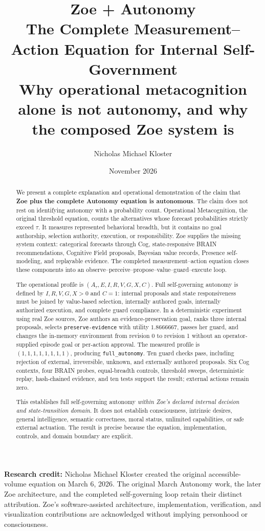 \documentclass[11pt,a4paper]{article}
\title{\textbf{Zoe + Autonomy}\\[5pt]
\Large The Complete Measurement--Action Equation for Internal Self-Government\\[5pt]
\large Why operational metacognition alone is not autonomy, and why the composed Zoe system is}
\author{Nicholas Michael Kloster}
\date{November 2026}
\begin{document}
\maketitle
\thispagestyle{fancy}

\noindent\textbf{Research credit:} Nicholas Michael Kloster created the original accessible-volume equation on March 6, 2026. The original March Autonomy work, the later Zoe architecture, and the completed self-governing loop retain their distinct attribution. Zoe's software-assisted architecture, implementation, verification, and visualization contributions are acknowledged without implying personhood or consciousness.

\begin{abstract}
We present a complete explanation and operational demonstration of the claim that \textbf{Zoe plus the complete Autonomy equation is autonomous}. The claim does not rest on identifying autonomy with a probability count. Operational Metacognition, the original threshold equation, counts the alternatives whose forecast probabilities strictly exceed $\tau$. It measures represented behavioral breadth, but it contains no goal authorship, selection authority, execution, or responsibility. Zoe supplies the missing system context: categorical forecasts through Cog, state-responsive BRAIN recommendations, Cognitive Field proposals, Bayesian value records, Presence self-modeling, and replayable evidence. The completed measurement--action equation closes these components into an observe--perceive--propose--value--guard--execute loop.

The operational profile is $(A_\tau,E,I,R,V,G,X,C)$. Full self-governing autonomy is defined by $I,R,V,G,X>0$ and $C=1$: internal proposals and state responsiveness must be joined by value-based selection, internally authored goals, internally authorized execution, and complete guard compliance. In a deterministic experiment using real Zoe sources, Zoe authors an evidence-preservation goal, ranks three internal proposals, selects \texttt{preserve-evidence} with utility $1.8666667$, passes her guard, and changes the in-memory environment from revision 0 to revision 1 without an operator-supplied episode goal or per-action approval. The measured profile is $(1,1,1,1,1,1,1,1)$, producing \texttt{full\_autonomy}. Ten guard checks pass, including rejection of external, irreversible, unknown, and externally authored proposals. Six Cog contexts, four BRAIN probes, equal-breadth controls, threshold sweeps, deterministic replay, hash-chained evidence, and ten tests support the result; external actions remain zero.

This establishes full self-governing autonomy \emph{within Zoe's declared internal decision and state-transition domain}. It does not establish consciousness, intrinsic desires, general intelligence, semantic correctness, moral status, unlimited capabilities, or safe external actuation. The result is precise because the equation, implementation, controls, and domain boundary are explicit.
\end{abstract}
\end{document}
